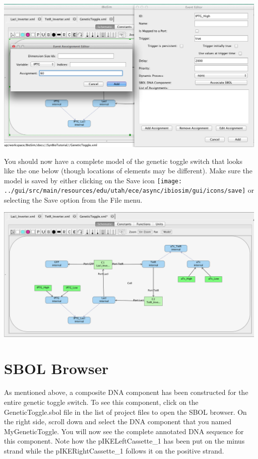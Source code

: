 \documentclass[titlepage,11pt]{article}
\begin{document}
\begin{center}
\includegraphics[width=160mm]{screenshots/eventGT}
\end{center}

You should now have a complete model of the genetic toggle switch that looks like the one below (though locations of elements may be different).  Make sure the model is saved by either clicking on the Save icon \texttt{[image: ../gui/src/main/resources/edu/utah/ece/async/ibiosim/gui/icons/save]} or selecting the Save option from the File menu.

\begin{center}
\includegraphics[width=160mm]{screenshots/saveGT}
\end{center}

\section{SBOL Browser}

As mentioned above, a composite DNA component has been constructed for the entire genetic toggle switch.  To see this component, click on the GeneticToggle.sbol file in the list of project files to open the SBOL browser.  On the right side, scroll down and select the DNA component that you named MyGeneticToggle.  You will now see the complete annotated DNA sequence for this component.  Note how the pIKELeftCassette\_1 has been put on the minus strand while the pIKERightCassette\_1 follows it on the positive strand.
\end{document}
